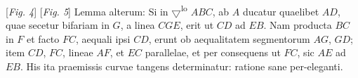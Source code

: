 \hspace*{25mm} [\textit{Fig. 4}]\hspace*{54mm} [\textit{Fig. 5}]
\pend
\vspace{2em}
\pstart Lemma alterum: Si in $\bigtriangledown$\textsuperscript{lo} $ABC$, ab $A$ ducatur quaelibet $AD$, quae secetur bifariam in $G$, a linea $CGE$, erit ut $CD$  ad $EB$. Nam producta $BC$ in $F$ et facto $FC$, aequali ipsi $CD$, erunt ob aequalitatem segmentorum $AG$, $GD$; item $CD$, $FC$, lineae $AF$, et $EC$ parallelae, et per consequens ut $FC$,  sic $AE$ ad $EB$. 
\pend 
\count{}
\count{}
\count{}
\pstart His ita praemissis curvae tangens determinatur: ratione sane per-eleganti.